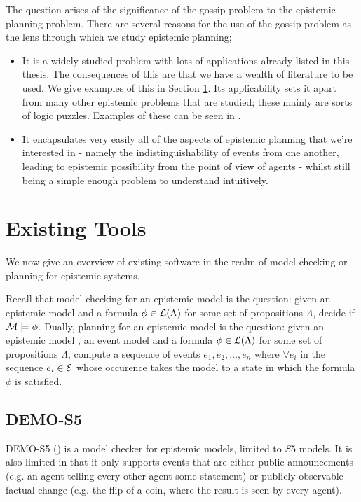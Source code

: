 \documentclass[10pt, a4paper]{report}
\begin{document}
The question arises of the significance of the gossip problem to the epistemic
planning problem. There are several reasons for the use of the gossip problem
as the lens through which we study epistemic planning; 

\begin{itemize}
\item It is a widely-studied problem with lots of applications already listed in
  this thesis. The consequences of this are that we have a wealth of literature
  to be used. We give examples of this in Section \ref{sec:ExistingTools}. Its
  applicability sets it apart from many other epistemic problems that are
  studied; these mainly are sorts of logic puzzles. Examples of these can be
  seen in \cite{DEMO-S5}.
\item It encapsulates very easily all of the aspects of epistemic planning that
  we're interested in - namely the indistinguishability of events from one
  another, leading to epistemic possibility from the point of view of agents -
  whilst still being a simple enough problem to understand intuitively.  
\end{itemize}

\section{Existing Tools}
\label{sec:ExistingTools}

We now give an overview of existing software in the realm of model checking or
planning for epistemic systems.

Recall that model checking for an epistemic model is the question: given an
epistemic model  and a formula $\phi \in \mathcal{L}(\Lambda)$ for some set of
propositions $\Lambda$, decide if $\mathcal{M} \models \phi$. Dually, planning for an
epistemic model is the question: given an epistemic model , an event
model  and a formula $\phi \in \mathcal{L}(\Lambda)$ for some set of
propositions $\Lambda$, compute a sequence of events $e_1, e_2, \ldots, e_n$
where $\forall e_i$ in the sequence $e_i \in \mathcal{E}$ whose occurence takes the
model  to a state in which the formula $\phi$ is satisfied. 

\subsection{DEMO-S5}

DEMO-S5 (\cite{DEMO-S5}) is a model checker for epistemic models, limited to
$S5$ models. It is also limited in that it only supports events that are either
public announcements (e.g. an agent telling every other agent some statement) or
publicly observable factual change (e.g. the flip of a coin, where the result is
seen by every agent).
\end{document}
